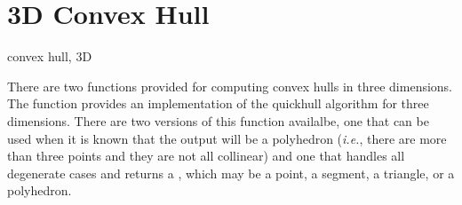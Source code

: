 \section{3D Convex Hull}
\begin{ccPackage}{convex hull, 3D}

There are two functions provided for computing convex hulls in three 
dimensions.  The function 
 provides an 
implementation of the quickhull algorithm \cite{bdh-qach-96} for three 
dimensions.  There are two versions of this
function availalbe, one that can be used when it is known that the output
will be a polyhedron (\textit{i.e.}, there are more than three points and
they are not all collinear) and one that handles all degenerate cases
and returns a , which may be a point, a segment, a
triangle, or a polyhedron.


\end{ccPackage}

